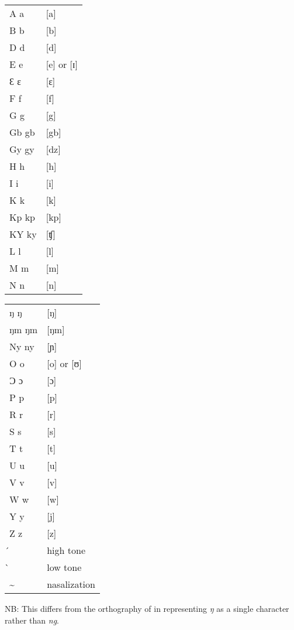 

\begin{tabularx}{.3\textwidth}{ll}
A a &	[a]\\
B b&	[b]\\
D d&	[d]\\
E e&	[e] or [ɪ]\\
Ɛ ɛ&	[ɛ]\\
F f&	[f]\\
G g&	[g]\\
Gb gb&	[gb]\\
Gy gy&	[dz]\\
H h&	[h]\\
I i& [i]\\
K k&	[k]\\
Kp kp& [kp]\\
KY ky&[ʧ]\\
L l&	[l]\\
M m&	[m]\\
N n&	[n]\\
\end{tabularx}
\begin{tabularx}{.3\textwidth}{ll}
ŋ ŋ&[ŋ]\\
ŋm ŋm&[ŋm]\\
Ny ny&[ɲ]\\
O o&	[o] or [ʊ]\\
Ɔ ɔ&	 [ɔ]\\
P p&	 [p]\\
R r &[r]\\
S s&	[s]\\
T t&	[t]\\
U u&	[u]\\
V v&	[v]\\
W w&	[w]\\
Y y&	[j]\\
Z z &[z]\\
{ } ́ &high tone\\
{ } ̀ &low tone\\
{ }{ } \~ &nasalization\\
\end{tabularx}

\bigskip

 \noindent NB: This differs from the orthography of \citet{DagaareLanguageCommission1982} in representing \textit{ŋ} as a single character rather than \textit{ng}.

